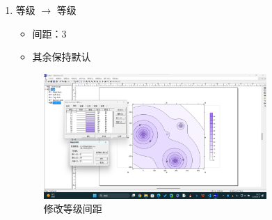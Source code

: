 \begin{enumerate}
\begin{enumerate}[label=\arabic*)]
        \item 等级 $\rightarrow $ 等级
        \begin{itemize}
            \item 间距：3
            \item 其余保持默认
        \end{itemize}
        \begin{figure}[H]
            \centering
            \includegraphics[width=0.8\textwidth]{figures/Sufer_step3-3.png}
            \caption{修改等级间距}
        \end{figure}


\end{enumerate}
\end{enumerate}
